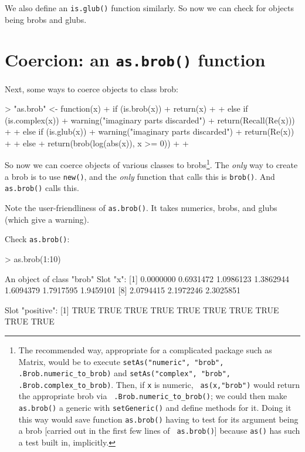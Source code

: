 \documentclass[a4paper]{article}
\begin{document}
We also define an {\tt is.glub()} function similarly.  So now we can
check for objects being brobs and glubs.

\section{Coercion: an {\tt as.brob()} function}

Next, some ways to coerce objects to class brob:

\begin{Schunk}
\begin{Sinput}
> "as.brob" <- function(x) {
+     if (is.brob(x)) {
+         return(x)
+     }
+     else if (is.complex(x)) {
+         warning("imaginary parts discarded")
+         return(Recall(Re(x)))
+     }
+     else if (is.glub(x)) {
+         warning("imaginary parts discarded")
+         return(Re(x))
+     }
+     else {
+         return(brob(log(abs(x)), x >= 0))
+     }
+ }
\end{Sinput}
\end{Schunk}

So now we can coerce objects of various classes to brobs\footnote{The
recommended way, appropriate for a complicated package such as Matrix,
would be to execute {\tt setAs("numeric", "brob",
.Brob.numeric\_to\_brob)} and {\tt setAs("complex", "brob",
.Brob.complex\_to\_brob)}.  Then, if {\tt x} is numeric, {\tt
as(x,"brob")} would return the appropriate brob via {\tt
.Brob.numeric\_to\_brob()}; we could then make {\tt as.brob()} a
generic with {\tt setGeneric()} and define methods for it.  Doing it
this way would save function {\tt as.brob()} having to test for its
argument being a brob [carried out in the first few lines of {\tt
as.brob()}] because {\tt as()} has such a test built in, implicitly.}.
The {\em only} way to create a brob is to use {\tt new()}, and the
{\em only} function that calls this is {\tt brob()}.  And {\tt
as.brob()} calls this.

Note the user-friendliness of {\tt as.brob()}.  It takes numerics,
brobs, and glubs (which give a warning).

Check  {\tt as.brob()}:

\begin{Schunk}
\begin{Sinput}
> as.brob(1:10)
\end{Sinput}
\begin{Soutput}
An object of class "brob"
Slot "x":
 [1] 0.0000000 0.6931472 1.0986123 1.3862944 1.6094379 1.7917595 1.9459101
 [8] 2.0794415 2.1972246 2.3025851

Slot "positive":
 [1] TRUE TRUE TRUE TRUE TRUE TRUE TRUE TRUE TRUE TRUE
\end{Soutput}
\end{Schunk}
\end{document}
